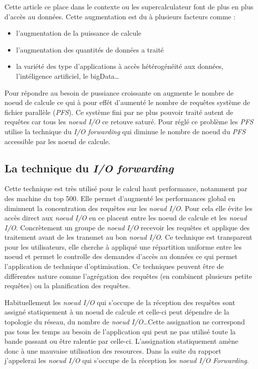 \documentclass[10pt, a4paper]{article}
\begin{document}
Cette article ce place dans le contexte ou les supercalculateur font de plus en plus d'accès au données. Cette augmentation est du à plusieurs facteurs comme :
\begin{itemize}
  \item l'augmentation de la puissance de calcule
  \item l'augmentation des quantités de données a traité
  \item la variété des type d'applications à accès hétérogénéité aux données, l'intéligence artificiel, le bigData\dots
\end{itemize}
Pour répondre au besoin de pussiance croissante on augmente le nombre de noeud de calcule ce qui à pour effét d'aumenté le nombre de requêtes système de fichier parallèle (\emph{PFS}). Ce système fini par ne plus pouvoir traité autent de requêtes car tous les \emph{noeud I/O} ce retouve saturé. Pour réglé ce problème les \emph{PFS} utilise la technique du \emph{I/O forwarding} qui diminue le nombre de noeud du \emph{PFS} accessible par les noeud de calcule.

\subsection{La technique du \emph{I/O forwarding}}

Cette technique est très utilisé pour le calcul haut performance, notamment par des machine du top 500\cite{}. Elle permet d'augmenté les performances global en diminuent la concentration des requêtes sur les \emph{noeud I/O}. Pour cela elle évite les accès direct aux \emph{noeud I/O} en ce placent entre les noeud de calcule et les \emph{noeud I/O}. Concrètement un groupe de \emph{noeud I/O} recevoir les requêtes et applique des traitement avant de les transmet au bon \emph{noeud I/O}. Ce technique est transparent pour les utilisateurs, elle cherche à appliqué une répartition uniforme entre les noeud et permet le controlle des demandes d'accès au données ce qui permet l'application de technique d'optimisation. Ce techniques peuvent être de différentes nature comme l'agrégation des requêtes (en combinent plusieurs petite requêtes) ou la planification des requêtes.

Habituellement les \emph{noeud I/O} qui s'occupe de la réception des requêtes sont assigné statiquement à un noeud de calcule et celle-ci peut dépendre de la topologie du réseau, du nombre de \emph{noeud I/O}\dots Cette assignation ne correspond pas tous les temps au besoin de l'application qui peut ne pas utilisé toute la bande passant ou être ralentie par celle-ci. L'assignation statiquement amène donc à une mauvaise utilisation des resources. Dans la suite du rapport j'appelerai les \emph{noeud I/O} qui s'occupe de la réception les \emph{noeud I/O Forwarding}.
\end{document}

